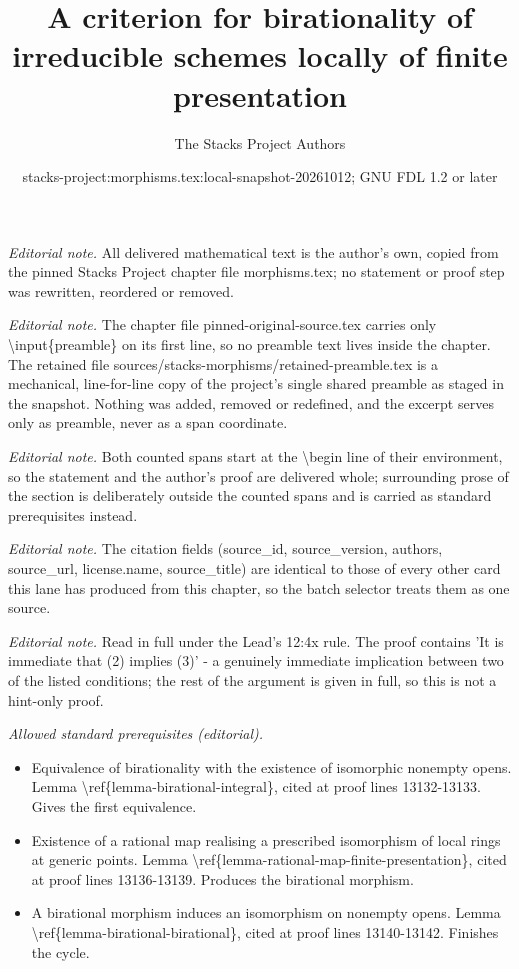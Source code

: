 \documentclass[10pt,a4paper]{amsart}
\title{A criterion for birationality of irreducible schemes locally of finite presentation}
\author{The Stacks Project Authors}
\date{stacks-project:morphisms.tex:local-snapshot-20261012; GNU FDL 1.2 or later}
\theoremstyle{plain}
\theoremstyle{definition}
\theoremstyle{remark}
\numberwithin{equation}{subsection}
\begin{document}
\maketitle
\setcounter{subsection}{1}
\noindent\textit{Editorial note.} All delivered mathematical text is the author's own, copied from the pinned Stacks Project chapter file morphisms.tex; no statement or proof step was rewritten, reordered or removed.\par\medskip
\noindent\textit{Editorial note.} The chapter file pinned-original-source.tex carries only \textbackslash{}input\{preamble\} on its first line, so no preamble text lives inside the chapter. The retained file sources/stacks-morphisms/retained-preamble.tex is a mechanical, line-for-line copy of the project's single shared preamble as staged in the snapshot. Nothing was added, removed or redefined, and the excerpt serves only as preamble, never as a span coordinate.\par\medskip
\noindent\textit{Editorial note.} Both counted spans start at the \textbackslash{}begin line of their environment, so the statement and the author's proof are delivered whole; surrounding prose of the section is deliberately outside the counted spans and is carried as standard prerequisites instead.\par\medskip
\noindent\textit{Editorial note.} The citation fields (source\_id, source\_version, authors, source\_url, license.name, source\_title) are identical to those of every other card this lane has produced from this chapter, so the batch selector treats them as one source.\par\medskip
\noindent\textit{Editorial note.} Read in full under the Lead's 12:4x rule. The proof contains 'It is immediate that (2) implies (3)' - a genuinely immediate implication between two of the listed conditions; the rest of the argument is given in full, so this is not a hint-only proof.\par\medskip
\noindent\textit{Allowed standard prerequisites (editorial).}\begin{itemize}
\item Equivalence of birationality with the existence of isomorphic nonempty opens. Lemma \textbackslash{}ref\{lemma-birational-integral\}, cited at proof lines 13132-13133. Gives the first equivalence.
\item Existence of a rational map realising a prescribed isomorphism of local rings at generic points. Lemma \textbackslash{}ref\{lemma-rational-map-finite-presentation\}, cited at proof lines 13136-13139. Produces the birational morphism.
\item A birational morphism induces an isomorphism on nonempty opens. Lemma \textbackslash{}ref\{lemma-birational-birational\}, cited at proof lines 13140-13142. Finishes the cycle.
\end{itemize}\medskip
\end{document}
